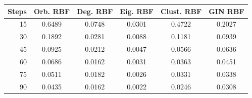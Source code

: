 \begin{tabular}{rccccc}
\toprule
\textbf{Steps} & \textbf{Orb. RBF} & \textbf{Deg. RBF} & \textbf{Eig. RBF} & \textbf{Clust. RBF} & \textbf{GIN RBF} \\
\midrule
15 & 0.6489 & 0.0748 & 0.0301 & 0.4722 & 0.2027 \\
30 & 0.1892 & 0.0281 & 0.0088 & 0.1181 & 0.0939 \\
45 & 0.0925 & 0.0212 & 0.0047 & 0.0566 & 0.0636 \\
60 & 0.0686 & 0.0162 & 0.0031 & 0.0363 & 0.0451 \\
75 & 0.0511 & 0.0182 & 0.0026 & 0.0331 & 0.0338 \\
90 & 0.0435 & 0.0162 & 0.0022 & 0.0246 & 0.0308 \\
\bottomrule
\end{tabular}